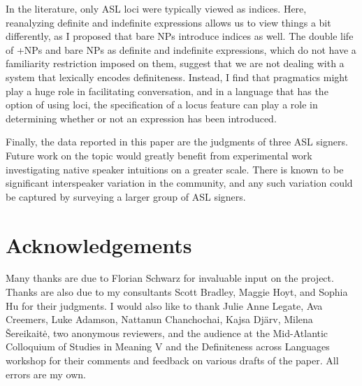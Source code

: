 \documentclass[output=paper,
modfonts
]{langscibook}
\begin{document}
In the literature, only ASL loci were typically viewed as indices. Here, reanalyzing definite and indefinite expressions allows us to view things a bit differently, as I proposed that bare NPs introduce indices as well. The double life of +NPs and bare NPs as definite and indefinite expressions, which do not have a familiarity restriction imposed on them, suggest that we are not dealing with a system that lexically encodes definiteness. Instead, I find that pragmatics might play a huge role in facilitating conversation, and in a language that has the option of using loci, the specification of a locus feature can play a role in determining whether or not an expression has been introduced.

Finally, the data reported in this paper are the judgments of three ASL signers. Future work on the topic would greatly benefit from experimental work investigating native speaker intuitions on a greater scale. There is known to be significant interspeaker variation in the community, and any such variation could be captured by surveying a larger group of ASL signers. 

\section*{Acknowledgements}

Many thanks are due to Florian Schwarz for invaluable input on the project. Thanks are also due to my consultants Scott Bradley, Maggie Hoyt, and Sophia Hu for their judgments. I would also like to thank Julie Anne Legate, Ava Creemers, Luke Adamson, Nattanun Chanchochai, Kajsa Dj{\"a}rv, Milena \v{S}ereikait\.{e}, two anonymous reviewers, and the audience at the Mid-Atlantic Colloquium of Studies in Meaning V and the Definiteness across Languages workshop for their comments and feedback on various drafts of the paper. All errors are my own.

{\sloppy
\printbibliography[heading=subbibliography,notkeyword=this]
}
\end{document}
